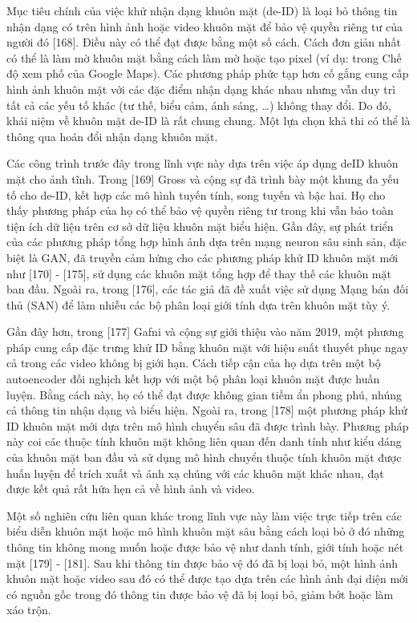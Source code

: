 \documentclass{article}
\begin{document}
Mục tiêu chính của việc khử nhận dạng khuôn mặt (de-ID) là loại bỏ thông tin nhận dạng có trên hình ảnh hoặc video khuôn mặt để bảo vệ quyền riêng tư của người đó [168]. Điều này có thể đạt được bằng một số cách. Cách đơn giản nhất có thể là làm mờ khuôn mặt bằng cách làm mờ hoặc tạo pixel (ví dụ: trong Chế độ xem phố của Google Maps). Các phương pháp phức tạp hơn cố gắng cung cấp hình ảnh khuôn mặt với các đặc điểm nhận dạng khác nhau nhưng vẫn duy trì tất cả các yếu tố khác (tư thế, biểu cảm, ánh sáng, …) không thay đổi. Do đó, khái niệm về khuôn mặt de-ID là rất chung chung. Một lựa chọn khả thi có thể là thông qua hoán đổi nhận dạng khuôn mặt.

Các công trình trước đây trong lĩnh vực này dựa trên việc áp dụng deID khuôn mặt cho ảnh tĩnh. Trong [169] Gross và cộng sự đã trình bày một khung đa yếu tố cho de-ID, kết hợp các mô hình tuyến tính, song tuyến và bậc hai. Họ cho thấy phương pháp của họ có thể bảo vệ quyền riêng tư trong khi vẫn bảo toàn tiện ích dữ liệu trên cơ sở dữ liệu khuôn mặt biểu hiện. Gần đây, sự phát triển của các phương pháp tổng hợp hình ảnh dựa trên mạng neuron sâu sinh sản, đặc biệt là GAN, đã truyền cảm hứng cho các phương pháp khử ID khuôn mặt mới như [170] - [175], sử dụng các khuôn mặt tổng hợp để thay thế các khuôn mặt ban đầu. Ngoài ra, trong [176], các tác giả đã đề xuất việc sử dụng Mạng bán đối thủ (SAN) để làm nhiễu các bộ phân loại giới tính dựa trên khuôn mặt tùy ý.

Gần đây hơn, trong [177] Gafni và cộng sự giới thiệu vào năm 2019, một phương pháp cung cấp đặc trưng khử ID bằng khuôn mặt với hiệu suất thuyết phục ngay cả trong các video không bị giới hạn. Cách tiếp cận của họ dựa trên một bộ autoencoder đối nghịch kết hợp với một bộ phân loại khuôn mặt được huấn luyện. Bằng cách này, họ có thể đạt được không gian tiềm ẩn phong phú, nhúng cả thông tin nhận dạng và biểu hiện. Ngoài ra, trong [178] một phương pháp khử ID khuôn mặt mới dựa trên mô hình chuyển sâu đã được trình bày. Phương pháp này coi các thuộc tính khuôn mặt không liên quan đến danh tính như kiểu dáng của khuôn mặt ban đầu và sử dụng mô hình chuyển thuộc tính khuôn mặt được huấn luyện để trích xuất và ánh xạ chúng với các khuôn mặt khác nhau, đạt được kết quả rất hứa hẹn cả về hình ảnh và video.

Một số nghiên cứu liên quan khác trong lĩnh vực này làm việc trực tiếp trên các biểu diễn khuôn mặt hoặc mô hình khuôn mặt sâu bằng cách loại bỏ ở đó những thông tin không mong muốn hoặc được bảo vệ như danh tính, giới tính hoặc nét mặt [179] - [181]. Sau khi thông tin được bảo vệ đó đã bị loại bỏ, một hình ảnh khuôn mặt hoặc video sau đó có thể được tạo dựa trên các hình ảnh đại diện mới có nguồn gốc trong đó thông tin được bảo vệ đã bị loại bỏ, giảm bớt hoặc làm xáo trộn.
\end{document}
